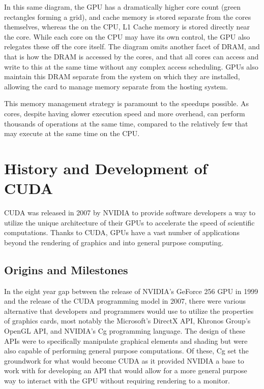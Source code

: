 \documentclass[11pt]{report}
\begin{document}
    In this same diagram, the GPU has a dramatically higher core count (green rectangles forming a grid), and cache memory is stored separate from the cores themselves, whereas the on the CPU, L1 Cache memory is stored directly near the core. While each core on the CPU may have its own control, the GPU also relegates these off the core itself. The diagram omits another facet of DRAM, and that is how the DRAM is accessed by the cores, and that all cores can access and write to this at the same time without any complex access scheduling. GPUs also maintain this DRAM separate from the system on which they are installed, allowing the card to manage memory separate from the hosting system.

    This memory management strategy is paramount to the speedups possible. As cores, despite having slower execution speed and more overhead, can perform thousands of operations at the same time, compared to the relatively few that may execute at the same time on the CPU. 
    

\section{History and Development of CUDA}
CUDA was released in 2007 by NVIDIA to provide software developers a way to utilize the unique architecture of their GPUs to accelerate the speed of scientific computations. Thanks to CUDA, GPUs have a vast number of applications beyond the rendering of graphics and into general purpose computing.

    \subsection{Origins and Milestones}
    In the eight year gap between the release of NVIDIA's GeForce 256 GPU in 1999 and the release of the CUDA programming model in 2007, there were various alternative that developers and programmers would use to utilize the properties of graphics cards, most notably the Microsoft's DirectX API, Khronos Group's OpenGL API, and NVIDIA's Cg programming language. The design of these APIs were to specifically manipulate graphical elements and shading but were also capable of performing general purpose computations\cite{CG_TUTORIAL}\cite{DIRECTX7}\cite{OPENGL1.0}. Of these, Cg set the groundwork for what would become CUDA as it provided NVIDIA a base to work with for developing an API that would allow for a more general purpose way to interact with the GPU without requiring rendering to a monitor.
    
\end{document}
